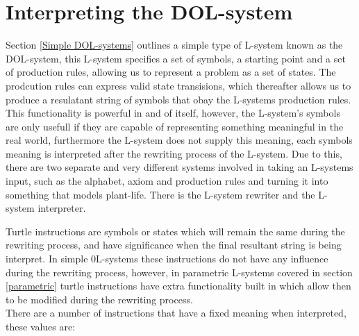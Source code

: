 \section{Interpreting the DOL-system} \label{Interpreting DOL-system}

\begin{flushleft}

Section \ref{Simple DOL-systems} outlines a simple type of L-system known as the DOL-system, this L-system specifies a set of symbols, a starting point and a set of production rules, allowing us to represent a problem as a set of states. The prodcution rules can express valid state transisions, which thereafter allows us to produce a resulatant string of symbols that obay the L-systems production rules. This functionality is powerful in and of itself, however, the L-system's symbols are only usefull if they are capable of representing something meaningful in the real world, furthermore the L-system does not supply this meaning, each symbols meaning is interpreted after the rewriting process of the L-system. Due to this, there are two separate and very different systems involved in taking an L-systems input, such as the alphabet, axiom and production rules and turning it into something that models plant-life. There is the L-system rewriter and the L-system interpreter.  \\

\vspace{5mm}

Turtle instructions are symbols or states which will remain the same during the rewriting process, and have significance when the final resultant string is being interpret. In simple 0L-systems these instructions do not have any influence during the rewriting process, however, in parametric L-systems covered in section \ref{parametric} turtle instructions have extra functionality built in which allow then to be modified during the rewriting process. \\
There are a number of instructions that have a fixed meaning when interpreted, these values are:

\vspace{5mm}


\end{flushleft}
